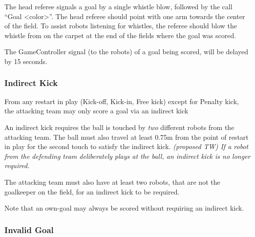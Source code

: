 \documentclass[12pt]{article}
\newcommand{\GoalScoredDelay}{15 seconds\xspace}
\begin{document}
The head referee signals a goal by a single whistle blow, followed by the call ``Goal \textless color\textgreater''.
The head referee should point with one arm towards the center of the field.
To assist robots listening for whistles, the referee should blow the whistle from on the carpet at the end of the fields where the goal was scored.

The GameController signal (to the robots) of a goal being scored, will be delayed by \GoalScoredDelay. 

\subsubsection{Indirect Kick}

From any restart in play (Kick-off, Kick-in, Free kick) except for Penalty kick, the attacking team may only score a goal via an indirect kick

An indirect kick requires the ball is touched by \textit{two} different robots from the attacking team. The ball must also travel at least 0.75m from the point of restart in play for the second touch to satisfy the indirect kick.
\textit{(proposed TW) If a robot from the defending team deliberately plays at the ball, an indirect kick is no longer required.}

The attacking team must also have at least two robots, that are not the goalkeeper on the field, for an indirect kick to be required.


Note that an own-goal may always be scored without requiring an indirect kick.

\subsubsection{Invalid Goal}
\end{document}
